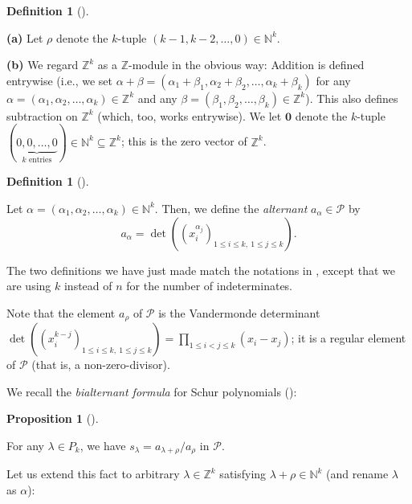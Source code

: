 \documentclass[numbers=enddot,12pt,final,onecolumn,notitlepage]{scrartcl}%
\theoremstyle{definition}
\newtheorem{prop}[theo]{Proposition}
\newenvironment{proposition}[1][]
{\begin{prop}[#1]\begin{leftbar}}
{\end{leftbar}\end{prop}}
\newtheorem{defi}[theo]{Definition}
\newenvironment{definition}[1][]
{\begin{defi}[#1]\begin{leftbar}}
{\end{leftbar}\end{defi}}
\let\prodnonlimits\prod
\renewcommand{\prod}{\prodnonlimits\limits}
\begin{document}
\begin{definition}
\textbf{(a)} Let $\rho$ denote the $k$-tuple $\left(  k-1,k-2,\ldots,0\right)
\in\mathbb{N}^{k}$.

\textbf{(b)} We regard $\mathbb{Z}^{k}$ as a $\mathbb{Z}$-module in the
obvious way: Addition is defined entrywise (i.e., we set $\alpha+\beta=\left(
\alpha_{1}+\beta_{1},\alpha_{2}+\beta_{2},\ldots,\alpha_{k}+\beta_{k}\right)
$ for any $\alpha=\left(  \alpha_{1},\alpha_{2},\ldots,\alpha_{k}\right)
\in\mathbb{Z}^{k}$ and any $\beta=\left(  \beta_{1},\beta_{2},\ldots,\beta
_{k}\right)  \in\mathbb{Z}^{k}$). This also defines subtraction on
$\mathbb{Z}^{k}$ (which, too, works entrywise). We let $\mathbf{0}$ denote the
$k$-tuple $\left(  \underbrace{0,0,\ldots,0}_{k\text{ entries}}\right)
\in\mathbb{N}^{k}\subseteq\mathbb{Z}^{k}$; this is the zero vector of
$\mathbb{Z}^{k}$.
\end{definition}

\begin{definition}
Let $\alpha=\left(  \alpha_{1},\alpha_{2},\ldots,\alpha_{k}\right)
\in\mathbb{N}^{k}$. Then, we define the \textit{alternant }$a_{\alpha}%
\in\mathcal{P}$ by%
\[
a_{\alpha}=\det\left(  \left(  x_{i}^{\alpha_{j}}\right)  _{1\leq i\leq
k,\ 1\leq j\leq k}\right)  .
\]

\end{definition}

The two definitions we have just made match the notations in \cite[\S 2.6]%
{GriRei18}, except that we are using $k$ instead of $n$ for the number of indeterminates.

Note that the element $a_{\rho}$ of $\mathcal{P}$ is the Vandermonde
determinant \newline$\det\left(  \left(  x_{i}^{k-j}\right)  _{1\leq i\leq
k,\ 1\leq j\leq k}\right)  =\prod_{1\leq i<j\leq k}\left(  x_{i}-x_{j}\right)
$; it is a regular element of $\mathcal{P}$ (that is, a non-zero-divisor).

We recall the \textit{bialternant formula} for Schur polynomials
(\cite[Corollary 2.6.7]{GriRei18}):

\begin{proposition}
\label{prop.bialternant}For any $\lambda\in P_{k}$, we have $s_{\lambda
}=a_{\lambda+\rho}/a_{\rho}$ in $\mathcal{P}$.
\end{proposition}

Let us extend this fact to arbitrary $\lambda\in\mathbb{Z}^{k}$ satisfying
$\lambda+\rho\in\mathbb{N}^{k}$ (and rename $\lambda$ as $\alpha$):
\end{document}
